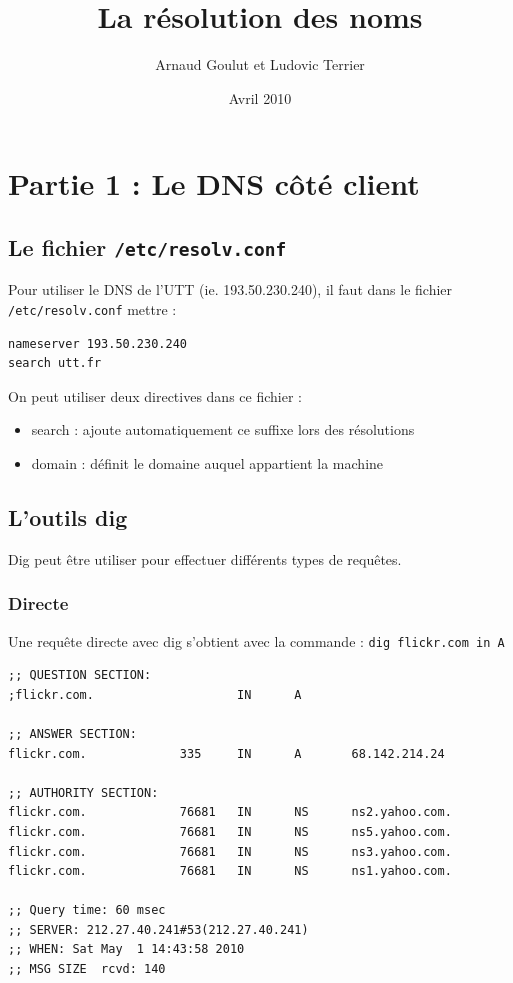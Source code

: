 \documentclass[12pt,a4paper,notitlepage]{article}
\begin{document}
\title{La résolution des noms}
\author{Arnaud Goulut et Ludovic Terrier}
\date{Avril 2010}
\maketitle



\thispagestyle{empty}




\section{Partie 1 : Le DNS côté client}

\subsection{Le fichier \texttt{/etc/resolv.conf}}
Pour utiliser le DNS de l'UTT (ie. 193.50.230.240), il faut dans le fichier \texttt{/etc/resolv.conf} mettre : \\

\begin{lstlisting}[title=Contenu du fichier resolv.conf]
nameserver 193.50.230.240
search utt.fr
\end{lstlisting}

\bigskip
On peut utiliser deux directives dans ce fichier :
\begin{itemize}
\item search : ajoute automatiquement ce suffixe lors des résolutions
\item domain : définit le domaine auquel appartient la machine
\end{itemize}


\subsection{L'outils dig}
Dig peut être utiliser pour effectuer différents types de requêtes.

\subsubsection{Directe}

Une requête directe avec dig s'obtient avec la commande : \texttt{dig flickr.com in A}
\begin{lstlisting}[title=Résultat d'une requête directe]
;; QUESTION SECTION:
;flickr.com.                    IN      A

;; ANSWER SECTION:
flickr.com.             335     IN      A       68.142.214.24

;; AUTHORITY SECTION:
flickr.com.             76681   IN      NS      ns2.yahoo.com.
flickr.com.             76681   IN      NS      ns5.yahoo.com.
flickr.com.             76681   IN      NS      ns3.yahoo.com.
flickr.com.             76681   IN      NS      ns1.yahoo.com.

;; Query time: 60 msec
;; SERVER: 212.27.40.241#53(212.27.40.241)
;; WHEN: Sat May  1 14:43:58 2010
;; MSG SIZE  rcvd: 140
\end{lstlisting}
\end{document}
